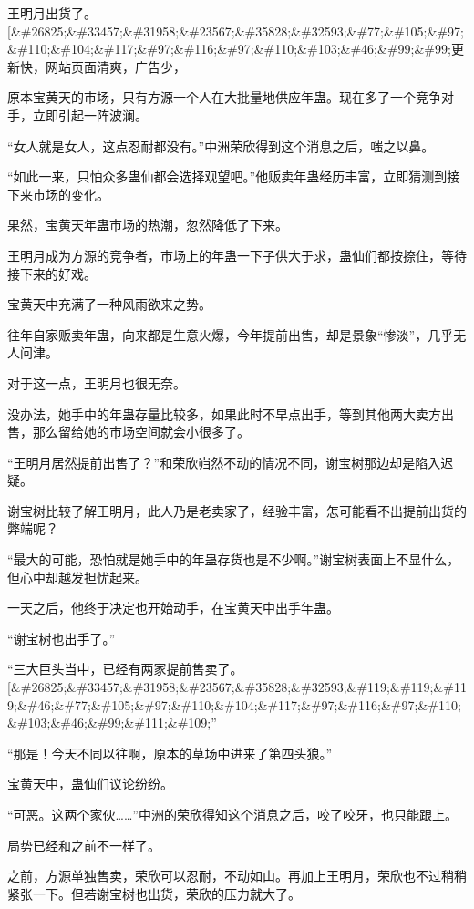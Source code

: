 
\begin{this_body}

王明月出货了。[\&\#26825;\&\#33457;\&\#31958;\&\#23567;\&\#35828;\&\#32593;\&\#77;\&\#105;\&\#97;\&\#110;\&\#104;\&\#117;\&\#97;\&\#116;\&\#97;\&\#110;\&\#103;\&\#46;\&\#99;\&\#99;更新快，网站页面清爽，广告少，

原本宝黄天的市场，只有方源一个人在大批量地供应年蛊。现在多了一个竞争对手，立即引起一阵波澜。

“女人就是女人，这点忍耐都没有。”中洲荣欣得到这个消息之后，嗤之以鼻。

“如此一来，只怕众多蛊仙都会选择观望吧。”他贩卖年蛊经历丰富，立即猜测到接下来市场的变化。

果然，宝黄天年蛊市场的热潮，忽然降低了下来。

王明月成为方源的竞争者，市场上的年蛊一下子供大于求，蛊仙们都按捺住，等待接下来的好戏。

宝黄天中充满了一种风雨欲来之势。

往年自家贩卖年蛊，向来都是生意火爆，今年提前出售，却是景象“惨淡”，几乎无人问津。

对于这一点，王明月也很无奈。

没办法，她手中的年蛊存量比较多，如果此时不早点出手，等到其他两大卖方出售，那么留给她的市场空间就会小很多了。

“王明月居然提前出售了？”和荣欣岿然不动的情况不同，谢宝树那边却是陷入迟疑。

谢宝树比较了解王明月，此人乃是老卖家了，经验丰富，怎可能看不出提前出货的弊端呢？

“最大的可能，恐怕就是她手中的年蛊存货也是不少啊。”谢宝树表面上不显什么，但心中却越发担忧起来。

一天之后，他终于决定也开始动手，在宝黄天中出手年蛊。

“谢宝树也出手了。”

“三大巨头当中，已经有两家提前售卖了。[\&\#26825;\&\#33457;\&\#31958;\&\#23567;\&\#35828;\&\#32593;\&\#119;\&\#119;\&\#119;\&\#46;\&\#77;\&\#105;\&\#97;\&\#110;\&\#104;\&\#117;\&\#97;\&\#116;\&\#97;\&\#110;\&\#103;\&\#46;\&\#99;\&\#111;\&\#109;”

“那是！今天不同以往啊，原本的草场中进来了第四头狼。”

宝黄天中，蛊仙们议论纷纷。

“可恶。这两个家伙……”中洲的荣欣得知这个消息之后，咬了咬牙，也只能跟上。

局势已经和之前不一样了。

之前，方源单独售卖，荣欣可以忍耐，不动如山。再加上王明月，荣欣也不过稍稍紧张一下。但若谢宝树也出货，荣欣的压力就大了。


\end{this_body}
